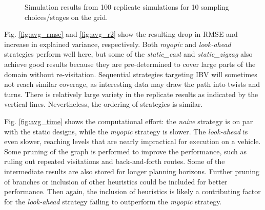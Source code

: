 \begin{figure}[h!]
  \hfill 
\caption{Simulation results from 100 replicate simulations for 10
  sampling choices/stages on the grid. }  
\label{fig:sim_results}
\end{figure}

Fig. \ref{fig:avg_rmse} and \ref{fig:avg_r2} show the resulting drop
in RMSE and increase in explained variance, respectively. Both
\textit{myopic} and \textit{look-ahead} strategies perform well here,
but some of the \textit{static\_east} and \textit{static\_zigzag} also
achieve good results because they are pre-determined to cover large
parts of the domain without re-visitation. Sequential strategies
targeting IBV will sometimes not reach similar coverage, as
interesting data may draw the path into twists and turns. There is
relatively large variety in the replicate results as indicated by the
vertical lines. Nevertheless, the ordering of strategies is similar.


Fig. \ref{fig:avg_time} shows the computational effort: the
\textit{naive} strategy is on par with the static designs, while the
\textit{myopic} strategy is slower. The \textit{look-ahead} is even
slower, reaching levels that are nearly impractical for execution on a
vehicle. Some pruning of the graph is performed to improve the
performance, such as ruling out repeated visitations and
back-and-forth routes. Some of the intermediate results are also
stored for longer planning horizons. Further pruning of branches or
inclusion of other heuristics could be included for better
performance. Then again, the inclusion of heuristics is likely a
contributing factor for the \textit{look-ahead} strategy failing to
outperform the \textit{myopic} strategy.


